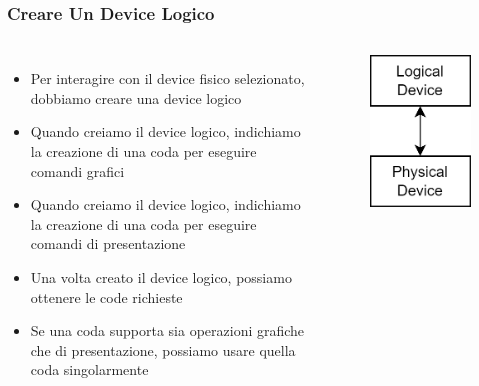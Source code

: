 \begin{frame}
\frametitle{Creare Un Device Logico}
\begin{columns}


\begin{itemize}
\item Per interagire con il device fisico selezionato, dobbiamo creare una device logico
\item Quando creiamo il device logico, indichiamo la creazione di una coda per eseguire comandi grafici
\item Quando creiamo il device logico, indichiamo la creazione di una coda per eseguire comandi di presentazione
\item Una volta creato il device logico, possiamo ottenere le code richieste
\item Se una coda supporta sia operazioni grafiche che di presentazione, possiamo usare quella coda singolarmente
\end{itemize}


\begin{figure}[ht]
    \centering
    \includegraphics[scale=0.2]{images/SlidesInitializingVulkan/LogicalDevice.png}
\end{figure}

\end{columns}
\end{frame}
